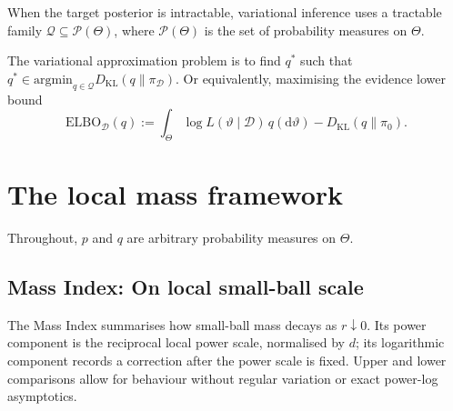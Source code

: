 \documentclass[11pt,a4paper]{article}
\theoremstyle{compactplain}
\theoremstyle{compactdefinition}
\numberwithin{equation}{section}
\begin{document}
When the target posterior is intractable, variational inference uses a tractable family \(\mathcal Q\subseteq\mathcal P(\Theta)\), where \(\mathcal P(\Theta)\) is the set of probability measures on \(\Theta\).

The variational approximation problem is to find $q^*$ such that
\(q^{*}\in \mathrm{argmin}_{q\in\mathcal Q} D_{\mathrm{KL}}(q\|\pi_{\mathcal D})\).
Or equivalently, maximising the evidence lower bound
\[
\mathrm{ELBO}_{\mathcal D}(q)
:=
\int_{\Theta}\log L(\vartheta\mid\mathcal D)\,q(\mathrm d\vartheta)
-
D_{\mathrm{KL}}(q\|\pi_0).
\]

\section{The local mass framework}
\label{sec:local framework}

Throughout, \(p\) and \(q\) are arbitrary probability measures on \(\Theta\).

\subsection{Mass Index: On local small-ball scale}

\label{subsec:mass}

The Mass Index summarises how small-ball mass decays as \(r\downarrow0\). Its power component is the reciprocal local power scale, normalised by \(d\); its logarithmic component records a correction after the power scale is fixed. Upper and lower comparisons allow for behaviour without regular variation or exact power-log asymptotics.
\end{document}
